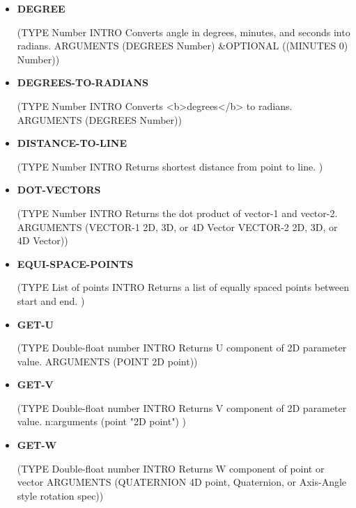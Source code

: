 \documentclass [11pt]{book}
\begin{document}
\begin{itemize}
\item {}
\label{prim:degree}
\textbf{DEGREE}

(TYPE Number INTRO  Converts angle in degrees, minutes, and seconds into radians.
 ARGUMENTS (DEGREES Number) \&OPTIONAL ((MINUTES 0) Number))



\item {}
\label{prim:degrees-to-radians}
\textbf{DEGREES-TO-RADIANS}

(TYPE Number INTRO  Converts <b>degrees</b> to radians.
 ARGUMENTS (DEGREES Number))



\item {}
\label{prim:distance-to-line}
\textbf{DISTANCE-TO-LINE}

(TYPE Number INTRO  Returns shortest distance from point to line.
)



\item {}
\label{prim:dot-vectors}
\textbf{DOT-VECTORS}

(TYPE Number INTRO  Returns the dot product of vector-1 and vector-2.
 ARGUMENTS (VECTOR-1 2D, 3D, or 4D Vector VECTOR-2 2D, 3D, or 4D Vector))



\item {}
\label{prim:equi-space-points}
\textbf{EQUI-SPACE-POINTS}

(TYPE List of points INTRO  Returns a list of equally spaced points between start and end.
)



\item {}
\label{prim:get-u}
\textbf{GET-U}

(TYPE Double-float number INTRO  Returns U component of 2D parameter value.
 ARGUMENTS (POINT 2D point))



\item {}
\label{prim:get-v}
\textbf{GET-V}

(TYPE Double-float number INTRO  Returns V component of 2D parameter value.
n:arguments (point "2D point")
)



\item {}
\label{prim:get-w}
\textbf{GET-W}

(TYPE Double-float number INTRO  Returns W component of point or vector
 ARGUMENTS (QUATERNION 4D point, Quaternion, or Axis-Angle style rotation spec))




\end{itemize}
\end{document}
